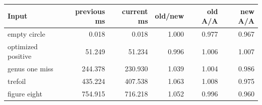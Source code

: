 \begin{center}
\small
\begin{tabular}{lrrrrr}
\toprule
Input & previous ms & current ms & old/new & old A/A & new A/A\\
\midrule
empty circle & 0.018 & 0.018 & 1.000 & 0.977 & 0.967\\
optimized positive & 51.249 & 51.234 & 0.996 & 1.006 & 1.007\\
genus one miss & 244.378 & 230.930 & 1.039 & 1.004 & 0.986\\
trefoil & 435.224 & 407.538 & 1.063 & 1.008 & 0.975\\
figure eight & 754.915 & 716.218 & 1.052 & 0.996 & 0.960\\
\bottomrule
\end{tabular}
\end{center}
